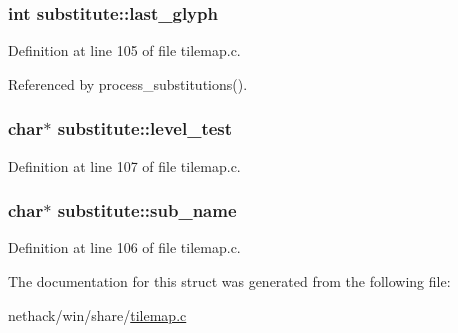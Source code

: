 \hypertarget{structsubstitute_a535e9fe4f8931d2fb69f21c57b9aebab}{
\subsubsection[{last\+\_\+glyph}]{\setlength{\rightskip}{0pt plus 5cm}int substitute\+::last\+\_\+glyph}}\label{structsubstitute_a535e9fe4f8931d2fb69f21c57b9aebab}


Definition at line 105 of file tilemap.\+c.



Referenced by process\+\_\+substitutions().

\hypertarget{structsubstitute_ad843568440ff0c5acefadbaa821bdbbe}{
\subsubsection[{level\+\_\+test}]{ char$\ast$ substitute\+::level\+\_\+test}}\label{structsubstitute_ad843568440ff0c5acefadbaa821bdbbe}


Definition at line 107 of file tilemap.\+c.

\hypertarget{structsubstitute_ab99ffe46a4c110c1ea1a64f0a9ff4a99}{
\subsubsection[{sub\+\_\+name}]{ char$\ast$ substitute\+::sub\+\_\+name}}\label{structsubstitute_ab99ffe46a4c110c1ea1a64f0a9ff4a99}


Definition at line 106 of file tilemap.\+c.



The documentation for this struct was generated from the following file\+:\begin{DoxyCompactItemize}
\item 
nethack/win/share/\hyperlink{tilemap_8c}{tilemap.\+c}\end{DoxyCompactItemize}
